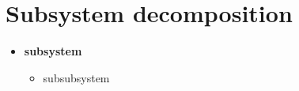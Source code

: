 \section{Subsystem decomposition}
\begin{itemize}
\item \textbf{subsystem}
	\begin{itemize}
		\item subsubsystem
	\end{itemize}
\end{itemize}

